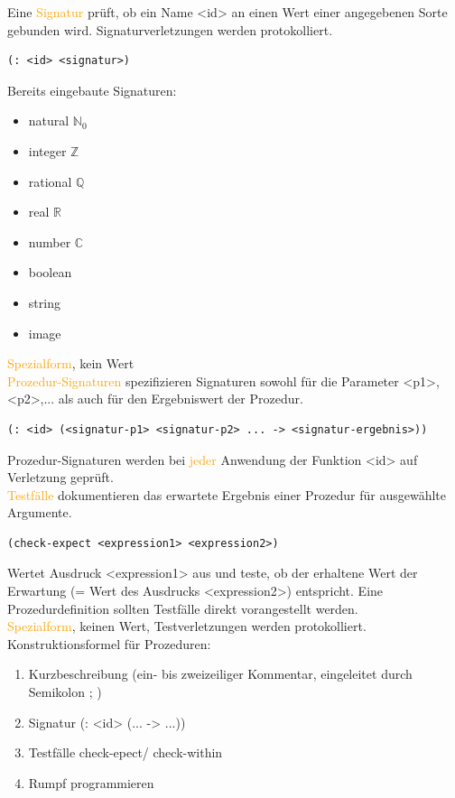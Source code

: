 \documentclass[paper=a4, fontsize=11pt]{scrartcl}
\numberwithin{equation}{section}
\numberwithin{figure}{section}
\numberwithin{table}{section}
\begin{document}
Eine \textcolor{orange}{Signatur} prüft, ob ein Name <id> an einen Wert einer angegebenen Sorte gebunden wird. Signaturverletzungen werden protokolliert.
\begin{lstlisting}
(: <id> <signatur>)
\end{lstlisting}

Bereits eingebaute Signaturen: 
\begin{itemize}
\item natural $\mathbb{N}_{0}$
\item integer $\mathbb{Z}$
\item rational $\mathbb{Q}$
\item real $\mathbb{R}$
\item number $\mathbb{C}$
\item boolean
\item string
\item image
\end{itemize}

\textcolor{orange}{Spezialform}, kein Wert \\

\textcolor{orange}{Prozedur-Signaturen} spezifizieren Signaturen sowohl für die Parameter <p1>,<p2>,... als auch für den Ergebniswert der Prozedur. 
\begin{lstlisting}
(: <id> (<signatur-p1> <signatur-p2> ... -> <signatur-ergebnis>))
\end{lstlisting}
Prozedur-Signaturen werden bei \textcolor{orange}{jeder} Anwendung der Funktion <id> auf Verletzung geprüft. \\

\textcolor{orange}{Testfälle} dokumentieren das erwartete Ergebnis einer Prozedur für ausgewählte Argumente.
\begin{lstlisting}
(check-expect <expression1> <expression2>)
\end{lstlisting}

Wertet Ausdruck <expression1> aus und teste, ob der erhaltene Wert der Erwartung (= Wert des Ausdrucks <expression2>) entspricht. Eine Prozedurdefinition sollten Testfälle direkt vorangestellt werden. \\
\textcolor{orange}{Spezialform}, keinen Wert, Testverletzungen werden protokolliert. \\

Konstruktionsformel für Prozeduren: 
\begin{enumerate}
\item Kurzbeschreibung (ein- bis zweizeiliger Kommentar, eingeleitet durch Semikolon ; )
\item Signatur (: <id> (... -> ...))
\item Testfälle check-epect/ check-within
\item Rumpf programmieren
\end{enumerate}
\end{document}
